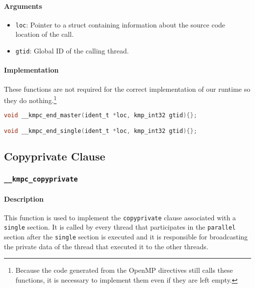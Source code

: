 \paragraph{Arguments}
\begin{itemize}
	\item \texttt{loc}: Pointer to a struct containing information about the source code location
	      of the call.
	\item \texttt{gtid}: Global ID of the calling thread.
\end{itemize}

\paragraph{Implementation} These functions are not required for the correct implementation of our
runtime so they do nothing.\footnote{Because the code generated from the OpenMP directives still
	calls these functions, it is necessary to implement them even if they are left empty.}

\begin{lstlisting}[language=C, caption={__kmpc_end_master and __kmpc_end_single},
                   label={lst:kmpc-end-master}, escapechar=@]
void __kmpc_end_master(ident_t *loc, kmp_int32 gtid){};

void __kmpc_end_single(ident_t *loc, kmp_int32 gtid){};
\end{lstlisting}

\subsection{Copyprivate Clause}

\subsubsection{\texttt{\_\_kmpc\_copyprivate}}

\paragraph{Description} This function is used to implement the \texttt{copyprivate} clause
associated with a \texttt{single} section. It is called by every thread that participates in the
\texttt{parallel} section after the \texttt{single} section is executed and it is responsible for
broadcasting the private data of the thread that executed it to the other threads.

